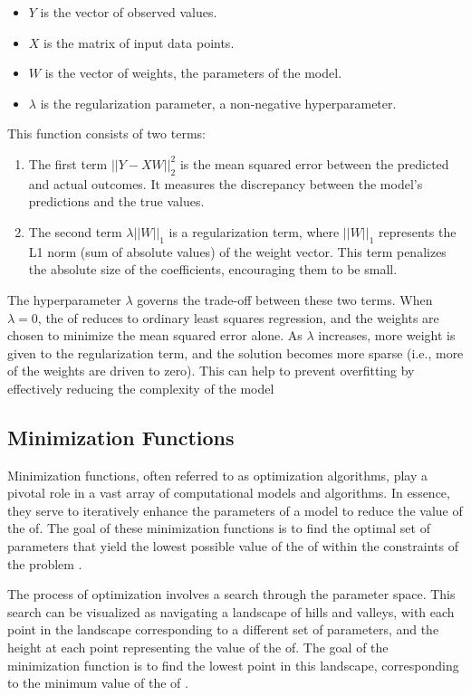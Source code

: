 \documentclass[
  a4paper,  %
  twoside,  %
  bibliography=totoc,
  headsepline,
  cleardoublepage=empty,
  parskip=half,
  draft=false
]{scrbook}
\begin{document}
\begin{itemize}
  \item \(Y\) is the vector of observed values.
  \item \(X\) is the matrix of input data points.
  \item \(W\) is the vector of weights, the parameters of the model.
  \item \(\lambda\) is the regularization parameter, a non-negative hyperparameter.
\end{itemize}

This function consists of two terms:
\begin{enumerate}
  \item The first term \(||Y - XW||^2_2\) is the mean squared error between the predicted and actual outcomes.
  It measures the discrepancy between the model's predictions and the true values.
  \item The second term \(\lambda ||W||_1\) is a regularization term, where \(||W||_1\) represents the L1 norm (sum of absolute values) of the weight vector.
  This term penalizes the absolute size of the coefficients, encouraging them to be small.
\end{enumerate}
The hyperparameter \(\lambda\) governs the trade-off between these two terms.
When \(\lambda = 0\), the \gls{of} reduces to ordinary least squares regression, and the weights are chosen to minimize the mean squared error alone.
As \(\lambda\) increases, more weight is given to the regularization term, and the solution becomes more sparse (i.e., more of the weights are driven to zero).
This can help to prevent overfitting by effectively reducing the complexity of the model \cite{ShalevShwartz2014}

\subsection{Minimization Functions}
\label{subsec:minimizationFunctions}
Minimization functions, often referred to as optimization algorithms, play a pivotal role in a vast array of computational models and algorithms.
In essence, they serve to iteratively enhance the parameters of a model to reduce the value of the \gls{of}.
The goal of these minimization functions is to find the optimal set of parameters that yield the lowest possible value of the \gls{of} within the constraints of the problem \cite{Nocedal2006}.

The process of optimization involves a search through the parameter space.
This search can be visualized as navigating a landscape of hills and valleys, with each point in the landscape corresponding to a different set of parameters, and the height at each point representing the value of the \gls{of}.
The goal of the minimization function is to find the lowest point in this landscape, corresponding to the minimum value of the \gls{of} \cite{Goodfellow2017}.
\end{document}
